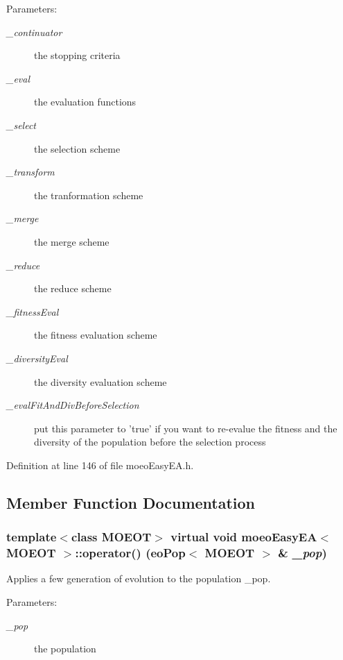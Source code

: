 \begin{Desc}
\item[Parameters:]
\begin{description}
\item[{\em \_\-continuator}]the stopping criteria \item[{\em \_\-eval}]the evaluation functions \item[{\em \_\-select}]the selection scheme \item[{\em \_\-transform}]the tranformation scheme \item[{\em \_\-merge}]the merge scheme \item[{\em \_\-reduce}]the reduce scheme \item[{\em \_\-fitness\-Eval}]the fitness evaluation scheme \item[{\em \_\-diversity\-Eval}]the diversity evaluation scheme \item[{\em \_\-eval\-Fit\-And\-Div\-Before\-Selection}]put this parameter to 'true' if you want to re-evalue the fitness and the diversity of the population before the selection process \end{description}
\end{Desc}


Definition at line 146 of file moeo\-Easy\-EA.h.

\subsection{Member Function Documentation}
\subsubsection{\setlength{\rightskip}{0pt plus 5cm}template$<$class MOEOT$>$ virtual void \bf{moeo\-Easy\-EA}$<$ MOEOT $>$::operator() (\bf{eo\-Pop}$<$ MOEOT $>$ \& {\em \_\-pop})\hspace{0.3cm}{\tt  [inline, virtual]}}\label{classmoeoEasyEA_f18e8fd179fbb2b89f4a59d213317170}


Applies a few generation of evolution to the population \_\-pop. 

\begin{Desc}
\item[Parameters:]
\begin{description}
\item[{\em \_\-pop}]the population \end{description}
\end{Desc}


